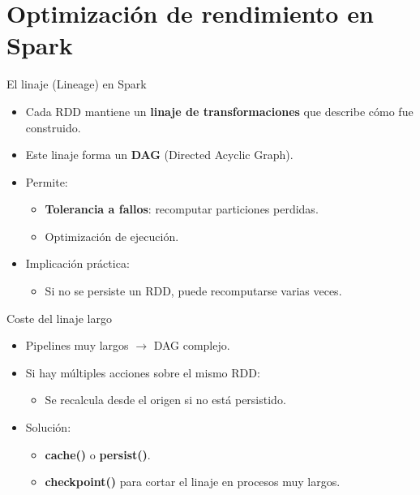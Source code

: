 \documentclass{beamer}
\begin{document}
\section{Optimización de rendimiento en Spark}

\begin{frame}{El linaje (Lineage) en Spark}
\begin{itemize}
  \item Cada RDD mantiene un \textbf{linaje de transformaciones} que describe cómo fue construido.
  \item Este linaje forma un \textbf{DAG} (Directed Acyclic Graph).
  \item Permite:
  \begin{itemize}
    \item \textbf{Tolerancia a fallos}: recomputar particiones perdidas.
    \item Optimización de ejecución.
  \end{itemize}
  \item Implicación práctica:
  \begin{itemize}
    \item Si no se persiste un RDD, puede recomputarse varias veces.
  \end{itemize}
\end{itemize}
\end{frame}

\begin{frame}{Coste del linaje largo}
\begin{itemize}
  \item Pipelines muy largos $\rightarrow$ DAG complejo.
  \item Si hay múltiples acciones sobre el mismo RDD:
  \begin{itemize}
    \item Se recalcula desde el origen si no está persistido.
  \end{itemize}
  \item Solución:
  \begin{itemize}
    \item \textbf{cache()} o \textbf{persist()}.
    \item \textbf{checkpoint()} para cortar el linaje en procesos muy largos.
  \end{itemize}
\end{itemize}
\end{frame}
\end{document}
